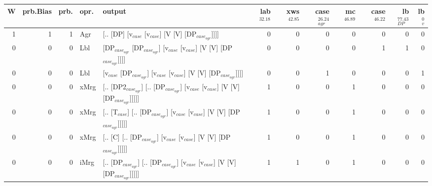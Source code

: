 \begin{tabularx}{\linewidth}{rrrlXrrrrrrr}
\hline
   W &   prb.Bias &   prb. & opr.   & output                                                                                                  &   lab$^{32.18}$ &   xws$^{42.85}$ &   case$_{agr}^{26.24}$ &   mc$^{46.89}$ &   case$^{46.22}$ &   lb$_{DP}^{77.43}$ &   lb$_{v}^{0}$ \\
\hline
   1 &       1 &   1 & Agr  & [.. [DP] [v$_{case}$ [v$_{case}$] [V [V] [DP$_{case_{agr}}$]]]]                                                       &             0 &             0 &                  0 &            0 &              0 &               0 &             0 \\
   0 &       0 &   0 & Lbl  & [DP$_{case_{agr}}$ [DP$_{case_{agr}}$] [v$_{case}$ [v$_{case}$] [V [V] [DP$_{case_{agr}}$]]]]                                     &             0 &             0 &                  0 &            0 &              1 &               1 &             0 \\
   0 &       0 &   0 & Lbl  & [v$_{case}$ [DP$_{case_{agr}}$] [v$_{case}$ [v$_{case}$] [V [V] [DP$_{case_{agr}}$]]]]                                          &             0 &             0 &                  1 &            0 &              0 &               0 &             1 \\
   0 &       0 &   0 & xMrg & [.. [DP2$_{case_{agr}}$] [.. [DP$_{case_{agr}}$] [v$_{case}$ [v$_{case}$] [V [V] [DP$_{case_{agr}}$]]]]]                          &             1 &             0 &                  0 &            1 &              0 &               0 &             0 \\
   0 &       0 &   0 & xMrg & [.. [T$_{case}$] [.. [DP$_{case_{agr}}$] [v$_{case}$ [v$_{case}$] [V [V] [DP$_{case_{agr}}$]]]]]                                &             1 &             0 &                  0 &            1 &              0 &               0 &             0 \\
   0 &       0 &   0 & xMrg & [.. [C] [.. [DP$_{case_{agr}}$] [v$_{case}$ [v$_{case}$] [V [V] [DP$_{case_{agr}}$]]]]]                                     &             1 &             0 &                  0 &            1 &              0 &               0 &             0 \\
   0 &       0 &   0 & iMrg & [.. [DP$_{case_{agr}}$] [.. [DP$_{case_{agr}}$] [v$_{case}$ [v$_{case}$] [V [V] [DP$_{case_{agr}}$]]]]]                           &             1 &             1 &                  0 &            1 &              0 &               0 &             0 \\

\end{tabularx}
